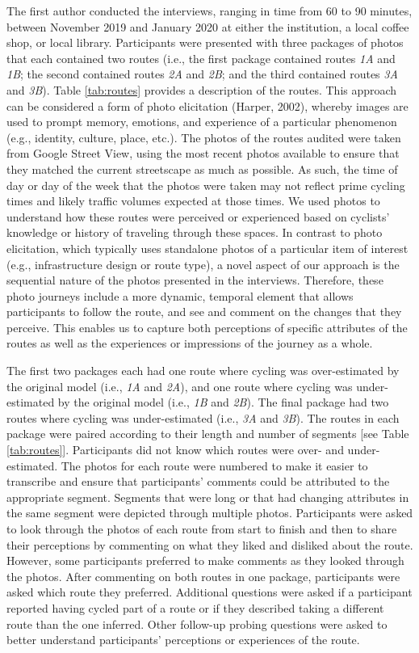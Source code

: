 \documentclass[]{elsarticle} %
\begin{document}
The first author conducted the interviews, ranging in time from 60 to 90
minutes, between November 2019 and January 2020 at either the
institution, a local coffee shop, or local library. Participants were
presented with three packages of photos that each contained two routes
(i.e., the first package contained routes \emph{1A} and \emph{1B}; the
second contained routes \emph{2A} and \emph{2B}; and the third contained
routes \emph{3A} and \emph{3B}). Table \ref{tab:routes} provides a
description of the routes. This approach can be considered a form of
photo elicitation (Harper, 2002), whereby images are used to prompt
memory, emotions, and experience of a particular phenomenon (e.g.,
identity, culture, place, etc.). The photos of the routes audited were
taken from Google Street View, using the most recent photos available to
ensure that they matched the current streetscape as much as possible. As
such, the time of day or day of the week that the photos were taken may
not reflect prime cycling times and likely traffic volumes expected at
those times. We used photos to understand how these routes were
perceived or experienced based on cyclists' knowledge or history of
traveling through these spaces. In contrast to photo elicitation, which
typically uses standalone photos of a particular item of interest (e.g.,
infrastructure design or route type), a novel aspect of our approach is
the sequential nature of the photos presented in the interviews.
Therefore, these photo journeys include a more dynamic, temporal element
that allows participants to follow the route, and see and comment on the
changes that they perceive. This enables us to capture both perceptions
of specific attributes of the routes as well as the experiences or
impressions of the journey as a whole.

The first two packages each had one route where cycling was
over-estimated by the original model (i.e., \emph{1A} and \emph{2A}),
and one route where cycling was under-estimated by the original model
(i.e., \emph{1B} and \emph{2B}). The final package had two routes where
cycling was under-estimated (i.e., \emph{3A} and \emph{3B}). The routes
in each package were paired according to their length and number of
segments {[}see Table \ref{tab:routes}{]}. Participants did not know
which routes were over- and under-estimated. The photos for each route
were numbered to make it easier to transcribe and ensure that
participants' comments could be attributed to the appropriate segment.
Segments that were long or that had changing attributes in the same
segment were depicted through multiple photos. Participants were asked
to look through the photos of each route from start to finish and then
to share their perceptions by commenting on what they liked and disliked
about the route. However, some participants preferred to make comments
as they looked through the photos. After commenting on both routes in
one package, participants were asked which route they preferred.
Additional questions were asked if a participant reported having cycled
part of a route or if they described taking a different route than the
one inferred. Other follow-up probing questions were asked to better
understand participants' perceptions or experiences of the route.
\end{document}
